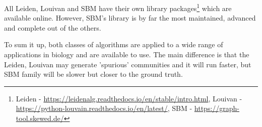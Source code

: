 All Leiden, Louivan and SBM have their own library packages\footnote{Leiden - \url{https://leidenalg.readthedocs.io/en/stable/intro.html}, Louivan - \url{https://python-louvain.readthedocs.io/en/latest/}, SBM - \url{https://graph-tool.skewed.de/}} which are available online. However, SBM's library is by far the most maintained, advanced and complete out of the others. 

To sum it up, both classes of algorithms are applied to a wide range of applications in biology and are available to use. The main difference is that the Leiden, Louivan may generate 'spurious' communities and it will run faster, but SBM family will be slower but closer to the ground truth.




